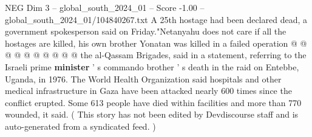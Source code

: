 \begin{textsample}{NEG Dim 3 – global\_south\_2024\_01 – Score -1.00 – global\_south\_2024\_01/104840267.txt}
A 25th hostage had been declared dead, a government spokesperson said on Friday."Netanyahu does not care if all the hostages are killed, his own brother Yonatan was killed in a failed operation @ @ @ @ @ @ @ @ @ @ the al-Qassam Brigades, said in a statement, referring to the Israeli prime \textbf{minister} ' s commando brother ' s death in the raid on Entebbe, Uganda, in 1976.
The World Health Organization said hospitals and other medical infrastructure in Gaza have been attacked nearly 600 times since the conflict erupted.
Some 613 people have died within facilities and more than 770 wounded, it said. ( This story has not been edited by Devdiscourse staff and is auto-generated from a syndicated feed. )

\end{textsample}
